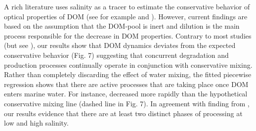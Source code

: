 A rich literature uses salinity as a tracer to estimate the conservative behavior of optical properties of DOM (see for example \cite{Kowalczuk2010} and \cite{Asmala2016}). However, current findings are based on the assumption that the DOM-pool is inert and dilution is the main process responsible for the decrease in DOM properties. Contrary to most studies (but see \cite{Goncalves2015}), our results show that DOM dynamics deviates from the expected conservative behavior (Fig. 7) suggesting that concurrent degradation and production processes continually operate in conjunction with conservative mixing. Rather than completely discarding the effect of water mixing, the fitted piecewise regression shows that there are active processes that are taking place once DOM enters marine water. For instance,  decreased more rapidly than the hypothetical conservative mixing line (dashed line in Fig. 7). In agreement with finding from \citet{Goncalves2015}, our results evidence that there are at least two distinct phases of processing at low and high salinity.

